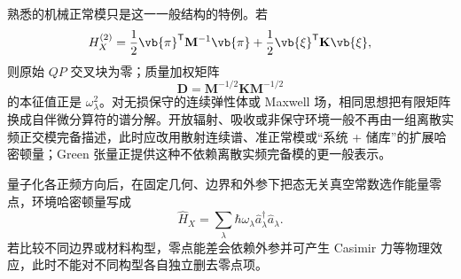 熟悉的机械正常模只是这一一般结构的特例。若
\[
H_X^{(2)}
=
\frac12\vb{\pi}^{\mathsf T}\mathbf M^{-1}\vb{\pi}
+\frac12\vb{\xi}^{\mathsf T}\mathbf K\vb{\xi},
\]
则原始 $QP$ 交叉块为零；质量加权矩阵
\[
\mathbf D
=
\mathbf M^{-1/2}\mathbf K\mathbf M^{-1/2}
\]
的本征值正是 $\omega_\lambda^2$。对无损保守的连续弹性体或 Maxwell 场，相同思想把有限矩阵换成自伴微分算符的谱分解。开放辐射、吸收或非保守环境一般不再由一组离散实频正交模完备描述，此时应改用散射连续谱、准正常模或“系统 + 储库”的扩展哈密顿量；Green 张量正提供这种不依赖离散实频完备模的更一般表示。

量子化各正频方向后，在固定几何、边界和外参下把态无关真空常数选作能量零点，环境哈密顿量写成
\begin{equation}
{
\hat H_X
=\sum_\lambda\hbar\omega_\lambda
\hat a_\lambda^\dagger\hat a_\lambda .}
\label{eq:general_harmonic_environment_hamiltonian}
\end{equation}
若比较不同边界或材料构型，零点能差会依赖外参并可产生 Casimir 力等物理效应，此时不能对不同构型各自独立删去零点项。

